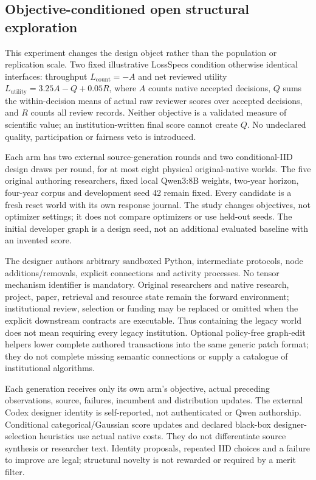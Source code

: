 \subsection{Objective-conditioned open structural exploration}
\label{sec:objective-structure-v8}

This experiment changes the design object rather than the population or
replication scale. Two fixed illustrative LossSpecs condition otherwise identical
interfaces: throughput $L_{\mathrm{count}}=-A$ and net reviewed utility
$L_{\mathrm{utility}}=3.25A-Q+0.05R$, where $A$ counts native accepted decisions,
$Q$ sums the within-decision means of actual raw reviewer scores over accepted
decisions, and $R$ counts all review records. Neither objective is a validated
measure of scientific value; an institution-written final score cannot create
$Q$. No undeclared quality, participation or fairness veto is introduced.

Each arm has two external source-generation rounds and two conditional-IID
design draws per round, for at most eight physical original-native worlds.
The five original authoring researchers, fixed local Qwen3:8B weights, two-year
horizon, four-year corpus and development seed 42 remain fixed. Every candidate
is a fresh reset world with its own response journal. The study changes
objectives, not optimizer settings; it does not compare optimizers or use
held-out seeds. The initial developer graph is a design seed, not an additional
evaluated baseline with an invented score.

The designer authors arbitrary sandboxed Python, intermediate protocols,
node additions/removals, explicit connections and activity processes. No tensor
mechanism identifier is mandatory. Original researchers and native research,
project, paper, retrieval and resource state remain the forward environment;
institutional review, selection or funding may be replaced or omitted when
the explicit downstream contracts are executable. Thus containing the legacy
world does not mean requiring every legacy institution. Optional policy-free
graph-edit helpers lower complete authored transactions into the same generic
patch format; they do not complete missing semantic connections or supply a
catalogue of institutional algorithms.

Each generation receives only its own arm's objective, actual preceding
observations, source, failures, incumbent and distribution updates. The
external Codex designer identity is self-reported, not authenticated or Qwen
authorship. Conditional categorical/Gaussian score updates and declared
black-box designer-selection heuristics use actual native costs. They do not
differentiate source synthesis or researcher text. Identity proposals, repeated
IID choices and a failure to improve are legal; structural novelty is not
rewarded or required by a merit filter.

